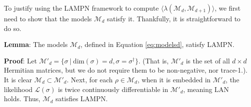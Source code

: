 \documentclass[aps,pra, twocolumn]{revtex4-1}
\newcommand{\M}{\mathcal{M}}
\newcommand{\cL}{\mathcal{L}}
\begin{document}
To justify using the LAMPN framework to compute $\langle \lambda(\M_{d}, \M_{d+1}) \rangle$, we first need to show that the models $\M_{d}$ satisfy it. Thankfully, it is straightforward to do so.

\textbf{Lemma}: The models $\M_{d}$, defined in Equation \eqref{eq:modelsd}, satisfy LAMPN.

\textbf{Proof}: Let $\M'_{d} = \{\sigma ~|~\mathrm{dim}(\sigma) = d, \sigma = \sigma^{\dagger}\}$. (That is, $\M'_{d}$ is the set of all $d \times d$ Hermitian matrices, but we do not require them to be non-negative, nor trace-1.). It is clear $\M_{d} \subset \M'_{d}$. Next, for each $\rho \in \M_{d}$, when it is embedded in $\M'_{d}$, the likelihood $\cL(\sigma)$ is twice continuously differentiable in $\M'_{d}$, meaning LAN holds. Thus, $\M_{d}$ satisfies LAMPN.
\end{document}
